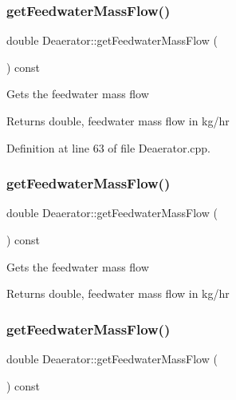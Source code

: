 \subsubsection{\texorpdfstring{get\+Feedwater\+Mass\+Flow()}{getFeedwaterMassFlow()}\hspace{0.1cm}{\footnotesize\ttfamily [1/3]}}
{\footnotesize\ttfamily double Deaerator\+::get\+Feedwater\+Mass\+Flow (\begin{DoxyParamCaption}{ }\end{DoxyParamCaption}) const}

Gets the feedwater mass flow \begin{DoxyReturn}{Returns}
double, feedwater mass flow in kg/hr 
\end{DoxyReturn}


Definition at line 63 of file Deaerator.\+cpp.

\mbox{\label{class_deaerator_ae1524e8b406c3d5c2823ae4e6bafe389}} 
\subsubsection{\texorpdfstring{get\+Feedwater\+Mass\+Flow()}{getFeedwaterMassFlow()}\hspace{0.1cm}{\footnotesize\ttfamily [2/3]}}
{\footnotesize\ttfamily double Deaerator\+::get\+Feedwater\+Mass\+Flow (\begin{DoxyParamCaption}{ }\end{DoxyParamCaption}) const}

Gets the feedwater mass flow \begin{DoxyReturn}{Returns}
double, feedwater mass flow in kg/hr 
\end{DoxyReturn}
\mbox{\label{class_deaerator_ae1524e8b406c3d5c2823ae4e6bafe389}} 
\subsubsection{\texorpdfstring{get\+Feedwater\+Mass\+Flow()}{getFeedwaterMassFlow()}\hspace{0.1cm}{\footnotesize\ttfamily [3/3]}}
{\footnotesize\ttfamily double Deaerator\+::get\+Feedwater\+Mass\+Flow (\begin{DoxyParamCaption}{ }\end{DoxyParamCaption}) const}

